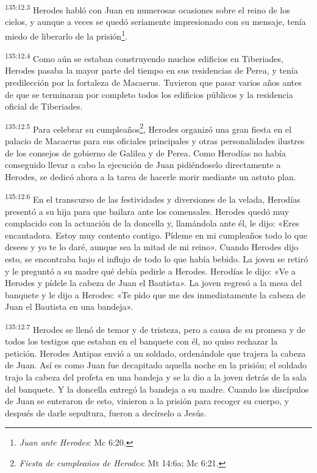 \par
\textsuperscript{135:12.3} Herodes habló con Juan en numerosas ocasiones sobre el reino de los cielos, y aunque a veces se quedó seriamente impresionado con su mensaje, tenía miedo de liberarlo de la prisión\footnote{\textit{Juan ante Herodes}: Mc 6:20.}.

\par
\textsuperscript{135:12.4} Como aún se estaban construyendo muchos edificios en Tiberiades, Herodes pasaba la mayor parte del tiempo en sus residencias de Perea, y tenía predilección por la fortaleza de Macaerus. Tuvieron que pasar varios años antes de que se terminaran por completo todos los edificios públicos y la residencia oficial de Tiberiades.

\par
\textsuperscript{135:12.5} Para celebrar su cumpleaños\footnote{\textit{Fiesta de cumpleaños de Herodes}: Mt 14:6a; Mc 6:21.}, Herodes organizó una gran fiesta en el palacio de Macaerus para sus oficiales principales y otras personalidades ilustres de los consejos de gobierno de Galilea y de Perea. Como Herodías no había conseguido llevar a cabo la ejecución de Juan pidiéndoselo directamente a Herodes, se dedicó ahora a la tarea de hacerle morir mediante un astuto plan.

\par
\textsuperscript{135:12.6} En el transcurso de las festividades y diversiones de la velada, Herodías presentó a su hija para que bailara ante los comensales. Herodes quedó muy complacido con la actuación de la doncella y, llamándola ante él, le dijo: «Eres encantadora. Estoy muy contento contigo. Pídeme en mi cumpleaños todo lo que desees y yo te lo daré, aunque sea la mitad de mi reino». Cuando Herodes dijo esto, se encontraba bajo el influjo de todo lo que había bebido. La joven se retiró y le preguntó a su madre qué debía pedirle a Herodes. Herodías le dijo: «Ve a Herodes y pídele la cabeza de Juan el Bautista». La joven regresó a la mesa del banquete y le dijo a Herodes: «Te pido que me des inmediatamente la cabeza de Juan el Bautista en una bandeja».

\par
\textsuperscript{135:12.7} Herodes se llenó de temor y de tristeza, pero a causa de su promesa y de todos los testigos que estaban en el banquete con él, no quiso rechazar la petición. Herodes Antipas envió a un soldado, ordenándole que trajera la cabeza de Juan. Así es como Juan fue decapitado aquella noche en la prisión; el soldado trajo la cabeza del profeta en una bandeja y se la dio a la joven detrás de la sala del banquete. Y la doncella entregó la bandeja a su madre. Cuando los discípulos de Juan se enteraron de esto, vinieron a la prisión para recoger su cuerpo, y después de darle sepultura, fueron a decírselo a Jesús.